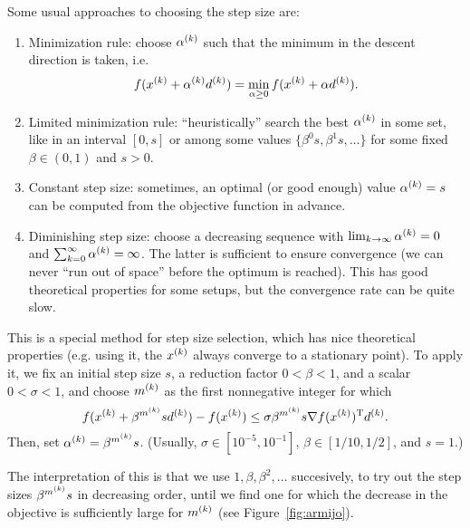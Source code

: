 \documentclass{article}
\begin{document}
Some usual approaches to choosing the step size are:
\begin{enumerate}
\item Minimization rule: choose \(\alpha^{(k)}\) such that the minimum in the descent direction is
  taken, i.e.
  \begin{equation*}
    f(x^{(k)} + \alpha^{(k)}d^{(k)}) = \min_{\alpha \geq 0} f(x^{(k)} + \alpha d^{(k)}).
  \end{equation*}
\item Limited minimization rule: ``heuristically'' search the best \(\alpha^{(k)}\) in some set,
  like in an interval \([0, s]\) or among some values \(\{\beta^0 s, \beta^1 s, \ldots \}\) for some
  fixed \(\beta \in (0, 1)\) and \(s > 0\).
\item Constant step size: sometimes, an optimal (or good enough) value \(\alpha^{(k)} = s\) can be
  computed from the objective function in advance.
\item Diminishing step size: choose a decreasing sequence with
  \(\lim_{k \to \infty} \alpha^{(k)} = 0\) and \(\sum_{k = 0}^{\infty} \alpha^{(k)} = \infty\).  The
  latter is sufficient to ensure convergence (we can never ``run out of space'' before the optimum
  is reached).  This has good theoretical properties for some setups, but the convergence rate can
  be quite slow.
\end{enumerate}


\label{s:armijo-rule}

This is a special method for step size selection, which has nice theoretical properties (e.g. using
it, the \(x^{(k)}\) always converge to a stationary point).  To apply it, we fix an initial step
size \(s\), a reduction factor \(0 < \beta < 1\), and a scalar \(0 < \sigma < 1\), and choose
\(m^{(k)}\) as the first nonnegative integer for which
\begin{equation*}
  f(x^{(k)} + \beta^{m^{(k)}} s d^{(k)}) - f(x^{(k)}) \leq
  \sigma \beta^{m^{(k)}} s \nabla f(x^{(k)})^{\mathrm{T}} d^{(k)}.
\end{equation*}
Then, set \(\alpha^{(k)} = \beta^{m^{(k)}} s\).  (Usually, \(\sigma \in [10^{-5}, 10^{-1}]\),
\(\beta \in [1/10, 1/2]\), and \(s = 1\).)

The interpretation of this is that we use \(1, \beta, \beta^2, \ldots\) succesively, to try out the
step sizes \(\beta^{m^{(k)}} s\) in decreasing order, until we find one for which the decrease in
the objective is sufficiently large for \(m^{(k)}\) (see Figure~\ref{fig:armijo}).
\end{document}
